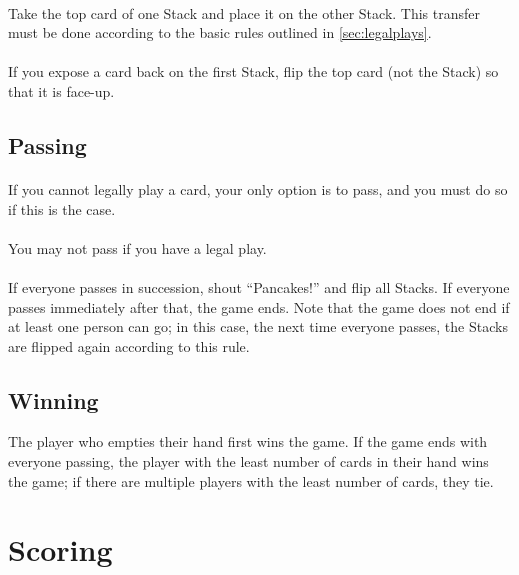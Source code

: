 \documentclass{article}
\begin{document}
\paragraph{}
Take the top card of one Stack and place it on the other Stack. This transfer must be done according to the basic rules outlined in \autoref{sec:legalplays}.

\paragraph{}
If you expose a card back on the first Stack, flip the top card (not the Stack) so that it is face-up.

\subsection{Passing}

\paragraph{}
If you cannot legally play a card, your only option is to pass, and you must do so if this is the case.

\paragraph{}
You may not pass if you have a legal play.

\paragraph{}
If everyone passes in succession, shout ``Pancakes!'' and flip all Stacks. If everyone passes immediately after that, the game ends. Note that the game does not end if at least one person can go; in this case, the next time everyone passes, the Stacks are flipped again according to this rule.

\subsection{Winning}

The player who empties their hand first wins the game. If the game ends with everyone passing, the player with the least number of cards in their hand wins the game; if there are multiple players with the least number of cards, they tie.

\section{Scoring}
\end{document}

